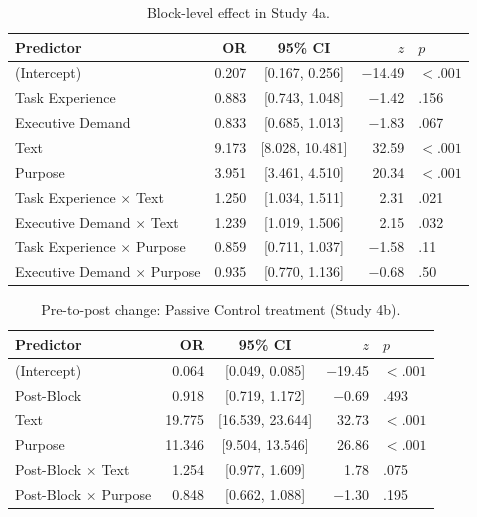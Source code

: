 \documentclass[pdflatex,sn-nature]{sn-jnl}
\begin{document}
\begin{appendices}
\begin{table}[htbp]
\caption{Block-level effect in Study 4a.}
\label{tab:S15}
\begin{tabular*}{\textwidth}{@{\extracolsep{\fill}}lrcrl@{}}
\toprule
Predictor & OR & 95\% CI & $z$ & $p$ \\
\midrule
(Intercept)                        & 0.207 & [0.167, 0.256] & $-$14.49 & $<.001$ \\
Task Experience                      & 0.883 & [0.743, 1.048] & $-$1.42  & .156    \\
Executive Demand                     & 0.833 & [0.685, 1.013] & $-$1.83  & .067    \\
Text                               & 9.173 & [8.028, 10.481] & 32.59  & $<.001$ \\
Purpose                            & 3.951 & [3.461, 4.510] & 20.34   & $<.001$ \\
Task Experience $\times$ Text        & 1.250 & [1.034, 1.511] & 2.31    & .021    \\
Executive Demand $\times$ Text       & 1.239 & [1.019, 1.506] & 2.15    & .032    \\
Task Experience $\times$ Purpose     & 0.859 & [0.711, 1.037] & $-$1.58  & .11     \\
Executive Demand $\times$ Purpose    & 0.935 & [0.770, 1.136] & $-$0.68  & .50     \\
\bottomrule
\end{tabular*}
\end{table}

\begin{table}[htbp]
\caption{Pre-to-post change: Passive Control treatment (Study 4b).}
\label{tab:S16}
\begin{tabular*}{\textwidth}{@{\extracolsep{\fill}}lrcrl@{}}
\toprule
Predictor & OR & 95\% CI & $z$ & $p$ \\
\midrule
(Intercept)                & 0.064 & [0.049, 0.085] & $-$19.45 & $<.001$ \\
Post-Block                 & 0.918 & [0.719, 1.172] & $-$0.69  & .493    \\
Text                       & 19.775& [16.539, 23.644]& 32.73  & $<.001$ \\
Purpose                    & 11.346& [9.504, 13.546] & 26.86  & $<.001$ \\
Post-Block $\times$ Text   & 1.254 & [0.977, 1.609] & 1.78    & .075    \\
Post-Block $\times$ Purpose& 0.848 & [0.662, 1.088] & $-$1.30  & .195    \\
\bottomrule
\end{tabular*}
\end{table}


\end{appendices}
\end{document}
